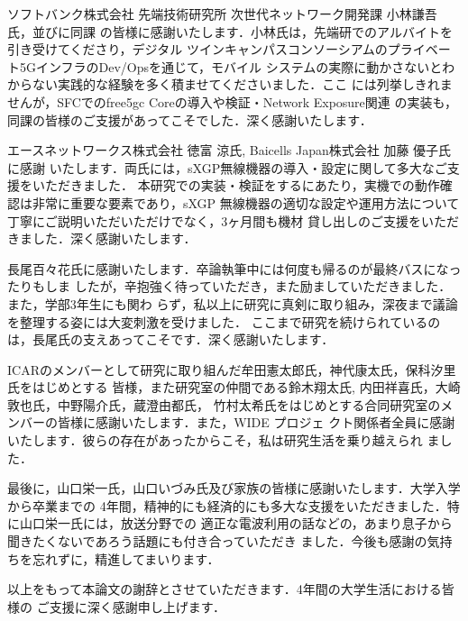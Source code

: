 ソフトバンク株式会社 先端技術研究所 次世代ネットワーク開発課 小林謙吾氏，並びに同課
の皆様に感謝いたします．小林氏は，先端研でのアルバイトを引き受けてくださり，デジタル
ツインキャンパスコンソーシアムのプライベート5GインフラのDev/Opsを通じて，モバイル
システムの実際に動かさないとわからない実践的な経験を多く積ませてくださいました．ここ
には列挙しきれませんが，SFCでのfree5gc Coreの導入や検証・Network Exposure関連
の実装も，同課の皆様のご支援があってこそでした．深く感謝いたします．

エースネットワークス株式会社 徳富 涼氏, Baicells Japan株式会社 加藤 優子氏に感謝
いたします．両氏には，sXGP無線機器の導入・設定に関して多大なご支援をいただきました．
本研究での実装・検証をするにあたり，実機での動作確認は非常に重要な要素であり，sXGP
無線機器の適切な設定や運用方法について丁寧にご説明いただいただけでなく，3ヶ月間も機材
貸し出しのご支援をいただきました．深く感謝いたします．

長尾百々花氏に感謝いたします．卒論執筆中には何度も帰るのが最終バスになったりもしま
したが，辛抱強く待っていただき，また励ましていただきました．また，学部3年生にも関わ
らず，私以上に研究に真剣に取り組み，深夜まで議論を整理する姿には大変刺激を受けました．
ここまで研究を続けられているのは，長尾氏の支えあってこそです．深く感謝いたします．

ICARのメンバーとして研究に取り組んだ牟田憲太郎氏，神代康太氏，保科汐里氏をはじめとする
皆様，また研究室の仲間である鈴木翔太氏, 内田祥喜氏，大崎敦也氏，中野陽介氏，蔵澄由都氏，
竹村太希氏をはじめとする合同研究室のメンバーの皆様に感謝いたします．また，WIDE プロジェ
クト関係者全員に感謝いたします．彼らの存在があったからこそ，私は研究生活を乗り越えられ
ました．

最後に，山口栄一氏，山口いづみ氏及び家族の皆様に感謝いたします．大学入学から卒業までの
4年間，精神的にも経済的にも多大な支援をいただきました．特に山口栄一氏には，放送分野での
適正な電波利用の話などの，あまり息子から聞きたくないであろう話題にも付き合っていただき
ました．今後も感謝の気持ちを忘れずに，精進してまいります．

以上をもって本論文の謝辞とさせていただきます．4年間の大学生活における皆様の
ご支援に深く感謝申し上げます．
